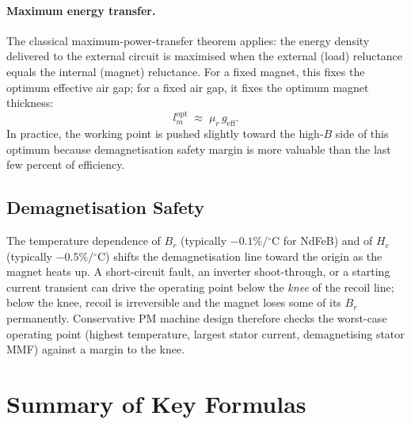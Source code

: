 \documentclass[12pt,a4paper]{article}
\newcommand{\degree}{\ensuremath{^{\circ}}}
\begin{document}
\paragraph{Maximum energy transfer.}
The classical maximum-power-transfer theorem applies: the energy
density delivered to the external circuit is maximised when the
external (load) reluctance equals the internal (magnet) reluctance.
For a fixed magnet, this fixes the optimum effective air gap; for a
fixed air gap, it fixes the optimum magnet thickness:
\begin{equation}
  l_m^\text{opt} \;\approx\; \mu_r\,g_\text{eff}.
\end{equation}
In practice, the working point is pushed slightly toward the
high-$B$ side of this optimum because demagnetisation safety margin
is more valuable than the last few percent of efficiency.

\subsection{Demagnetisation Safety}

The temperature dependence of $B_r$ (typically $-0.1\%/$\degree C for
NdFeB) and of $H_c$ (typically $-0.5\%/$\degree C) shifts the
demagnetisation line toward the origin as the magnet heats up.
A short-circuit fault, an inverter shoot-through, or a starting
current transient can drive the operating point below the
\emph{knee} of the recoil line; below the knee, recoil is irreversible
and the magnet loses some of its $B_r$ permanently. Conservative PM
machine design therefore checks the worst-case operating point
(highest temperature, largest stator current, demagnetising stator
MMF) against a margin to the knee.

\appendix
\section{Summary of Key Formulas}
\end{document}
